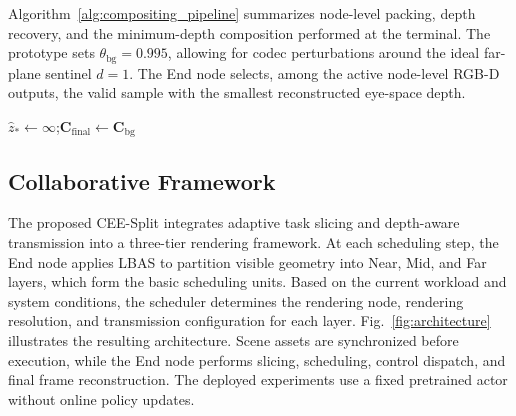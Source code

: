 \documentclass[10pt,journal,compsoc]{IEEEtran}
\begin{document}
Algorithm~\ref{alg:compositing_pipeline} summarizes node-level packing, depth recovery, and the minimum-depth composition performed at the terminal.
The prototype sets $\theta_{\mathrm{bg}}=0.995$, allowing for codec perturbations around the ideal far-plane sentinel $d=1$. The End node selects, among the active node-level RGB-D outputs, the valid sample with the smallest reconstructed eye-space depth.

\begin{algorithm}[t]
	\caption{Node-Level LDP and Minimum-Depth Composition}
	\label{alg:compositing_pipeline}
	\BlankLine
	\BlankLine
	$\widehat z_*\gets\infty$;\enskip $\mathbf{C}_{\mathrm{final}}\gets\mathbf{C}_{\mathrm{bg}}$\;
\end{algorithm}

\subsection{Collaborative Framework}

The proposed CEE-Split integrates adaptive task slicing and depth-aware transmission into a three-tier rendering framework. At each scheduling step, the End node applies LBAS to partition visible geometry into Near, Mid, and Far layers, which form the basic scheduling units. Based on the current workload and system conditions, the scheduler determines the rendering node, rendering resolution, and transmission configuration for each layer. Fig.~\ref{fig:architecture} illustrates the resulting architecture. Scene assets are synchronized before execution, while the End node performs slicing, scheduling, control dispatch, and final frame reconstruction. The deployed experiments use a fixed pretrained actor without online policy updates.
\end{document}
